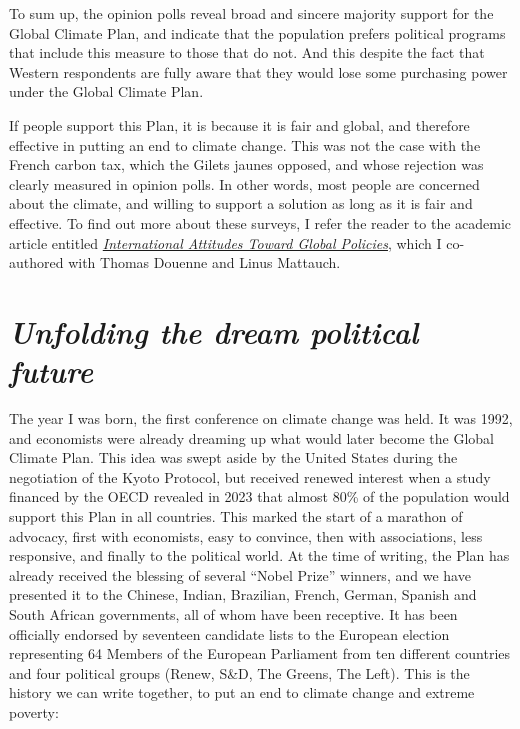 \documentclass[a5paper,english,openany]{memoir}
\begin{document}
To sum up, the opinion polls reveal broad and sincere majority support for the Global Climate Plan, and indicate that the population prefers political programs that include this measure to those that do not. And this despite the fact that Western respondents are fully aware that they would lose some purchasing power under the Global Climate Plan. 

If people support this Plan, it is because it is fair and global, and therefore effective in putting an end to climate change. This was not the case with the French carbon tax, which the Gilets jaunes opposed, and whose rejection was clearly measured in opinion polls. In other words, most people are concerned about the climate, and willing to support a solution as long as it is fair and effective. 
To find out more about these surveys, I refer the reader to the academic article entitled \href{https://papers.ssrn.com/sol3/papers.cfm?abstract_id=4448523}{\textit{International Attitudes Toward Global Policies}}, which I co-authored with Thomas Douenne and Linus Mattauch. 

\chapter*{\textit{Unfolding the dream political future}}\label{ch:narr_reve}

The year I was born, the first conference on climate change was held. It was 1992, and economists were already dreaming up what would later become the Global Climate Plan. This idea was swept aside by the United States during the negotiation of the Kyoto Protocol, but received renewed interest when a study financed by the OECD revealed in 2023 that almost 80\% of the population would support this Plan in all countries. This marked the start of a marathon of advocacy, first with economists, easy to convince, then with associations, less responsive, and finally to the political world. At the time of writing, the Plan has already received the blessing of several ``Nobel Prize'' winners, and we have presented it to the Chinese, Indian, Brazilian, French, German, Spanish and South African governments, all of whom have been receptive. It has been officially endorsed by seventeen candidate lists to the European election representing 64 Members of the European Parliament from ten different countries and four political groups (Renew, S\&D, The Greens, The Left). %
This is the history we can write together, to put an end to climate change and extreme poverty: 
\end{document}
